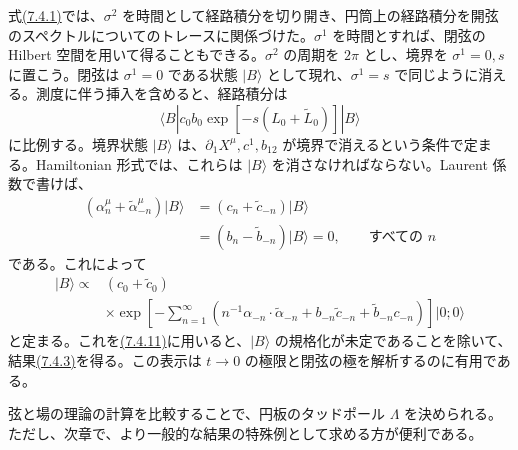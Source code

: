 式\hyperref[eq:7.4.1]{(7.4.1)}では、$\sigma^2$ を時間として経路積分を切り開き、円筒上の経路積分を開弦のスペクトルについてのトレースに関係づけた。$\sigma^1$ を時間とすれば、閉弦の Hilbert 空間を用いて得ることもできる。$\sigma^2$ の周期を $2\pi$ とし、境界を $\sigma^1=0,s$ に置こう。閉弦は $\sigma^1=0$ である状態 $\lvert B\rangle$ として現れ、$\sigma^1=s$ で同じように消える。測度に伴う挿入を含めると、経路積分は
\begin{equation}
\langle B|c_0b_0\exp[-s(L_0+\tilde L_0)]|B\rangle
\tag{7.4.11}\label{eq:7.4.11}
\end{equation}
に比例する。境界状態 $\lvert B\rangle$ は、$\partial_1X^\mu,c^1,b_{12}$ が境界で消えるという条件で定まる。Hamiltonian 形式では、これらは $\lvert B\rangle$ を消さなければならない。Laurent 係数で書けば、
\begin{equation}
\begin{aligned}
(\alpha_n^\mu+\tilde\alpha_{-n}^\mu)|B\rangle
&=(c_n+\tilde c_{-n})|B\rangle\\
&=(b_n-\tilde b_{-n})|B\rangle=0,
\qquad\text{すべての }n
\end{aligned}
\tag{7.4.12}\label{eq:7.4.12}
\end{equation}
である。これによって
\begin{equation}
\begin{aligned}
|B\rangle\propto{}&(c_0+\tilde c_0)\\
&\times\exp\left[-\sum_{n=1}^{\infty}
\left(n^{-1}\alpha_{-n}\cdot\tilde\alpha_{-n}
+b_{-n}\tilde c_{-n}+\tilde b_{-n}c_{-n}\right)\right]|0;0\rangle
\end{aligned}
\tag{7.4.13}\label{eq:7.4.13}
\end{equation}
と定まる。これを\hyperref[eq:7.4.11]{(7.4.11)}に用いると、$\lvert B\rangle$ の規格化が未定であることを除いて、結果\hyperref[eq:7.4.3]{(7.4.3)}を得る。この表示は $t\to0$ の極限と閉弦の極を解析するのに有用である。

弦と場の理論の計算を比較することで、円板のタッドポール $\Lambda$ を決められる。ただし、次章で、より一般的な結果の特殊例として求める方が便利である。


